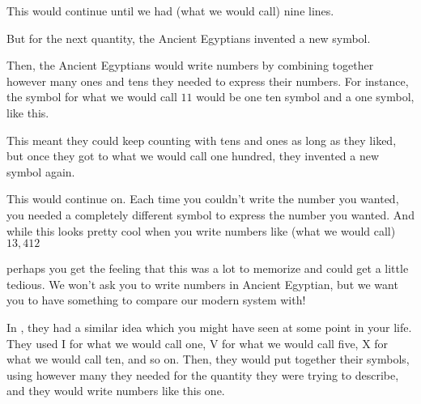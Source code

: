 \documentclass{ximera}
\begin{document}
This would continue until we had (what we would call) nine lines.

\begin{center}
\textpmhg{\HZi\HZi\HZi\HZi\HZi\HZi\HZi\HZi\HZi}
\end{center}

But for the next quantity, the Ancient Egyptians invented a new symbol.

\begin{center}
\textpmhg{\HVxx}
\end{center}


Then, the Ancient Egyptians would write numbers by combining together however many ones and tens they needed to express their numbers. For instance, the symbol for what we would call $11$ would be one ten symbol and a one symbol, like this.

\begin{center}
\textpmhg{\HVxx\HZi}
\end{center}

 This meant they could keep counting with tens and ones as long as they liked, but once they got to what we would call one hundred, they invented a new symbol again.

\begin{center}
\textpmhg{\HZvii}
\end{center}

This would continue on. Each time you couldn't write the number you wanted, you needed a completely different symbol to express the number you wanted. And while this looks pretty cool when you write numbers like (what we would call) $13,412$

\begin{center}
\textpmhg{\HDl\HMxii\HMxii\HMxii\HZvii\HZvii\HZvii\HZvii\HVxx\HZi}
\end{center}

perhaps you get the feeling that this was a lot to memorize and could get a little tedious. We won't ask you to write numbers in Ancient Egyptian, but we want you to have something to compare our modern system with!

In , they had a similar idea which you might have seen at some point in your life. They used I for what we would call one, V for what we would call five, X for what we would call ten, and so on. Then, they would put together their symbols, using however many they needed for the quantity they were trying to describe, and they would write numbers like this one. 
\end{document}
